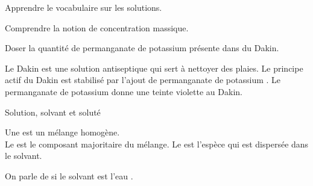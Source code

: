 \teteSndSolu


\vspace*{-36pt}


\begin{objectifs}
  \item Apprendre le vocabulaire sur les solutions.
  \item Comprendre la notion de concentration massique.
  \item Doser la quantité de permanganate de potassium présente dans du Dakin.
\end{objectifs}


\begin{encart}
  
  Le Dakin est une solution antiseptique qui sert à nettoyer des plaies. Le principe actif du Dakin est stabilisé par l'ajout de permanganate de potassium .
  Le permanganate de potassium donne une teinte violette au Dakin.
\end{encart}



\begin{doc}{Solution, solvant et soluté}
  \label{doc:solution}
  \vspace*{-24pt}
  \begin{encart}
    \chevron Une  est un mélange homogène. \\
    Le  est le composant majoritaire du mélange. Le  est l'espèce qui est dispersée dans le solvant.
  \end{encart}
  
  \begin{center}
  \end{center}
  
  \begin{encart}
    On parle de  si le solvant est l'eau .
  \end{encart}
\end{doc}


